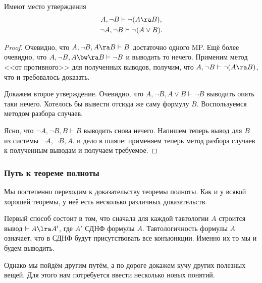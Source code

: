 \documentclass[a4paper,draft]{article}
\begin{document}
\begin{lemma}\label{lem:ded-imp-vee-eq}
  Имеют место утверждения
  \begin{gather}
    A, \neg B \vdash \neg (A \ra B),\\
    \neg A, \neg B \vdash \neg (A \vee B).
  \end{gather}
\end{lemma}
\begin{proof}
  Очевидно, что $A, \neg B, A\ra B \vdash B$ достаточно одного MP.
  Ещё более очевидно, что $A, \neg B, A\bw\ra B \vdash \neg B$ и выводить то нечего.
  Применим метод <<от противного>> для полученных выводов,
  получим, что $A, \neg B \vdash \neg (A \ra B)$, что и требовалось доказать.

  Докажем второе утверждение.
  Очевидно, что $A, \neg B, A\vee B \vdash \neg B$ выводить опять таки нечего.
  Хотелось бы вывести отсюда же саму формулу $B$. Воспользуемся методом разбора случаев.

  Ясно, что $\neg A, \neg B, B \vdash B$ выводить снова нечего.
  Напишем теперь вывод для $B$ из системы $\neg A, \neg B, A$.
  и дело в шляпе: применяем теперь метод разбора случаев к полученным выводам и получаем требуемое.
\end{proof}

\subsubsection{Путь к теореме полноты}

Мы постепенно переходим к доказательству теоремы полноты. Как и у всякой хорошей теоремы,
у неё есть несколько различных доказательств.

Первый способ состоит в том, что сначала для каждой тавтологии $A$ строится вывод $\vdash A \lra A'$,
где $A'$ СДНФ формулы $A$. Тавтологичность формулы $A$ означает, что в СДНФ будут присутствовать все конъюнкции.
Именно их то мы и будем выводить.

Однако мы пойдём другим путём, а по дороге докажем кучу других полезных вещей.
Для этого нам потребуется ввести несколько новых понятий.
\end{document}
